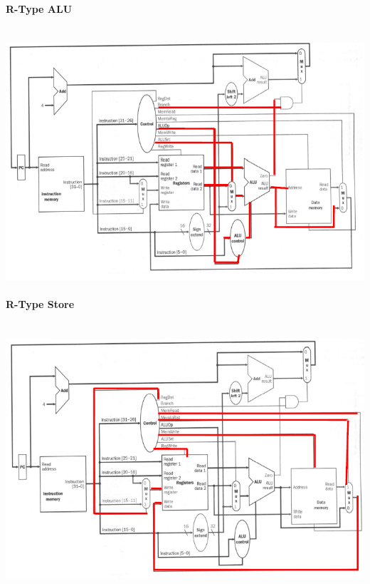 \documentclass[12 pt]{article}
\begin{document}
	\paragraph{R-Type ALU}~\\ \includegraphics[scale=0.7]{ralu}
	\paragraph{R-Type Store}~\\ \includegraphics[scale=0.7]{rstr}
\end{document}
